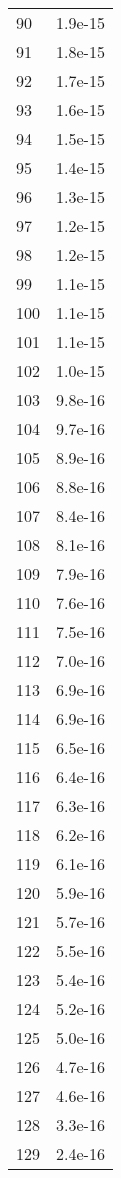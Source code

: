 \begin{tabular}{lr}
90  & 1.9e-15 \\
91  & 1.8e-15 \\
92  & 1.7e-15 \\
93  & 1.6e-15 \\
94  & 1.5e-15 \\
95  & 1.4e-15 \\
96  & 1.3e-15 \\
97  & 1.2e-15 \\
98  & 1.2e-15 \\
99  & 1.1e-15 \\
100 & 1.1e-15 \\
101 & 1.1e-15 \\
102 & 1.0e-15 \\
103 & 9.8e-16 \\
104 & 9.7e-16 \\
105 & 8.9e-16 \\
106 & 8.8e-16 \\
107 & 8.4e-16 \\
108 & 8.1e-16 \\
109 & 7.9e-16 \\
110 & 7.6e-16 \\
111 & 7.5e-16 \\
112 & 7.0e-16 \\
113 & 6.9e-16 \\
114 & 6.9e-16 \\
115 & 6.5e-16 \\
116 & 6.4e-16 \\
117 & 6.3e-16 \\
118 & 6.2e-16 \\
119 & 6.1e-16 \\
120 & 5.9e-16 \\
121 & 5.7e-16 \\
122 & 5.5e-16 \\
123 & 5.4e-16 \\
124 & 5.2e-16 \\
125 & 5.0e-16 \\
126 & 4.7e-16 \\
127 & 4.6e-16 \\
128 & 3.3e-16 \\
129 & 2.4e-16 \\
\bottomrule
\end{tabular}
